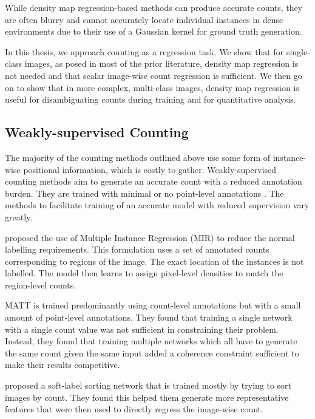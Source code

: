 \documentclass[../thesis.tex]{subfiles}
\begin{document}
While density map regression-based methods can produce accurate counts, they are often blurry and cannot accurately locate individual instances in dense environments \cite{cholakkal2020towards, xu2022autoscale} due to their use of a Gaussian kernel for ground truth generation.

In this thesis, we approach counting as a regression task. We show that for single-class images, as posed in most of the prior literature, density map regression is not needed and that scalar image-wise count regression is sufficient. We then go on to show that in more complex, multi-class images, density map regression is useful for disambiguating counts during training and for quantitative analysis.
 
\subsection{Weakly-supervised Counting} 
The majority of the counting methods outlined above use some form of instance-wise positional information, which is costly to gather. 
Weakly-supervised counting methods aim to generate an accurate count with a reduced annotation burden. They are trained with minimal \cite{lei2021towards, sam2019almost} or no point-level annotations \cite{borstel2016gaussian, yang2020weakly, wang2015deep}.
The methods to facilitate training of an accurate model with reduced supervision vary greatly.

\citet{borstel2016gaussian} proposed the use of Multiple Instance Regression (MIR) to reduce the normal labelling requirements. This formulation uses a set of annotated counts corresponding to regions of the image. The exact location of the instances is not labelled. The model then learns to assign pixel-level densities to match the region-level counts.

MATT \cite{lei2021towards} is trained predominantly using count-level annotations but with a small amount of point-level annotations. They found that training a single network with a single count value was not sufficient in constraining their problem. Instead, they found that training multiple networks which all have to generate the same count given the same input added a coherence constraint sufficient to make their results competitive.

\citet{yang2020weakly} proposed a soft-label sorting network that is trained mostly by trying to sort images by count. They found this helped them generate more representative features that were then used to directly regress the image-wise count.
\end{document}
